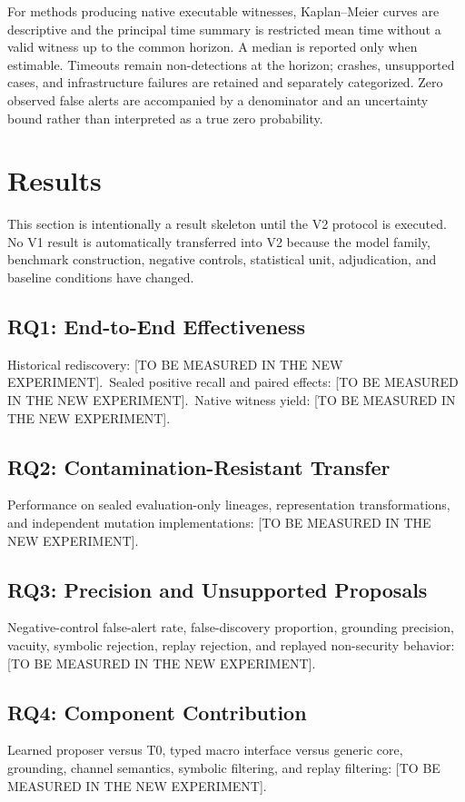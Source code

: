 \documentclass[journal]{IEEEtran}
\theoremstyle{definition}
\newcommand{\CrossTBD}{\textnormal{[TO BE MEASURED IN THE NEW EXPERIMENT]}}
\begin{document}
For methods producing native executable witnesses, Kaplan--Meier curves are descriptive and the principal time summary is restricted mean time without a valid witness up to the common horizon. A median is reported only when estimable. Timeouts remain non-detections at the horizon; crashes, unsupported cases, and infrastructure failures are retained and separately categorized. Zero observed false alerts are accompanied by a denominator and an uncertainty bound rather than interpreted as a true zero probability.

\section{Results}
\label{sec:results}

This section is intentionally a result skeleton until the V2 protocol is executed. No V1 result is automatically transferred into V2 because the model family, benchmark construction, negative controls, statistical unit, adjudication, and baseline conditions have changed.

\subsection{RQ1: End-to-End Effectiveness}
Historical rediscovery: \CrossTBD.\
Sealed positive recall and paired effects: \CrossTBD.\
Native witness yield: \CrossTBD.

\subsection{RQ2: Contamination-Resistant Transfer}
Performance on sealed evaluation-only lineages, representation transformations, and independent mutation implementations: \CrossTBD.

\subsection{RQ3: Precision and Unsupported Proposals}
Negative-control false-alert rate, false-discovery proportion, grounding precision, vacuity, symbolic rejection, replay rejection, and replayed non-security behavior: \CrossTBD.

\subsection{RQ4: Component Contribution}
Learned proposer versus T0, typed macro interface versus generic core, grounding, channel semantics, symbolic filtering, and replay filtering: \CrossTBD.
\end{document}
